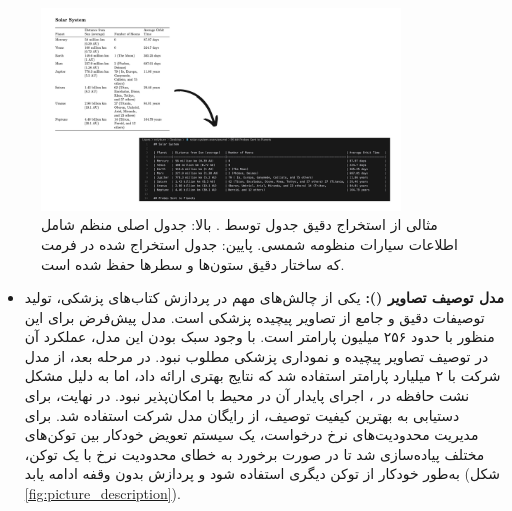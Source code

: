 \begin{figure}[!htbp]
    \centering
    \includegraphics[width=0.85\textwidth]{docling_md_2.png}
    \caption{مثالی از استخراج دقیق جدول توسط . بالا: جدول اصلی منظم شامل اطلاعات سیارات منظومه شمسی. پایین: جدول استخراج شده در فرمت  که ساختار دقیق ستون‌ها و سطرها حفظ شده است.}
    \label{fig:table_extraction}
\end{figure}

\begin{itemize}
    \item \textbf{مدل توصیف تصاویر ():} یکی از چالش‌های مهم در پردازش کتاب‌های پزشکی، تولید توصیفات دقیق و جامع از تصاویر پیچیده پزشکی است. مدل پیش‌فرض  برای این منظور  با حدود ۲۵۶ میلیون پارامتر است. با وجود سبک بودن این مدل، عملکرد آن در توصیف تصاویر پیچیده و نموداری پزشکی مطلوب نبود. در مرحله بعد، از مدل  شرکت  با ۲ میلیارد پارامتر استفاده شد که نتایج بهتری ارائه داد، اما به دلیل مشکل نشت حافظه  در ، اجرای پایدار آن در محیط  با  امکان‌پذیر نبود. در نهایت، برای دستیابی به بهترین کیفیت توصیف، از  رایگان مدل  شرکت  استفاده شد. برای مدیریت محدودیت‌های نرخ درخواست، یک سیستم تعویض خودکار بین توکن‌های مختلف پیاده‌سازی شد تا در صورت برخورد به خطای محدودیت نرخ با یک توکن، به‌طور خودکار از توکن دیگری استفاده شود و پردازش بدون وقفه ادامه یابد (شکل \ref{fig:picture_description}).
\end{itemize}

